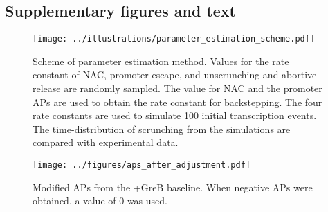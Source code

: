 \subsection{Supplementary figures and text}

\begin{figure}
    \begin{center}
      \texttt{[image: ../illustrations/parameter\_estimation\_scheme.pdf]}
    \end{center}
    \caption{Scheme of parameter estimation method. Values for the rate
    constant of NAC, promoter escape, and unscrunching and abortive release
    are randomly sampled. The value for NAC and the promoter APs are used to
    obtain the rate constant for backstepping. The four rate constants are
    used to simulate 100 initial transcription events. The time-distribution
    of scrunching from the simulations are compared with experimental data.}
    \label{fig:parameter_estimation_scheme}
\end{figure}

\begin{figure}
    \begin{center}
        \texttt{[image: ../figures/aps\_after\_adjustment.pdf]}
    \end{center}
    \caption{Modified APs from the +GreB baseline. When negative APs were
    obtained, a value of 0 was used.}
    \label{fig:aps_after_adjustment}
\end{figure}
